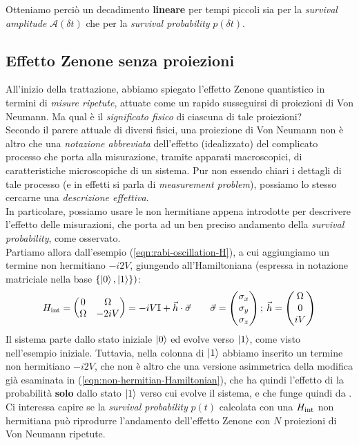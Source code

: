 \documentclass[../../InformazioneQuantistica.tex]{subfiles}
\begin{document}
Otteniamo perciò un decadimento \textbf{lineare} per tempi piccoli sia per la \textit{survival amplitude} $\mathcal{A}(\delta t)$ che per la \textit{survival probability} $p(\delta t)$.


\subsection{Effetto Zenone senza proiezioni}
All'inizio della trattazione, abbiamo spiegato l'effetto Zenone quantistico in termini di \textit{misure ripetute}, attuate come un rapido susseguirsi di proiezioni di Von Neumann. Ma qual è il \textit{significato fisico} di ciascuna di tale proiezioni?\\
Secondo il parere attuale di diversi fisici, una proiezione di Von Neumann non è altro che una \textit{notazione abbreviata} dell'effetto (idealizzato) del complicato processo che porta alla misurazione, tramite apparati macroscopici, di caratteristiche microscopiche di un sistema. Pur non essendo chiari i dettagli di tale processo (e in effetti si parla di \textit{measurement problem}), possiamo lo stesso cercarne una \textit{descrizione effettiva}.\\
In particolare, possiamo usare le  non hermitiane appena introdotte per descrivere l'effetto delle misurazioni, che porta ad un ben preciso andamento della \textit{survival probability}, come osservato.\\

Partiamo allora dall'esempio (\ref{eqn:rabi-oscillation-H}), a cui aggiungiamo un termine non hermitiano $-i2V$, giungendo all'Hamiltoniana (espressa in notazione matriciale nella base $\{\Ket{0}, \Ket{1}\})$:
\begin{align}
H_{\operatorname{int}} = \begin{pmatrix} 0 & \Omega \\ \Omega & - 2iV\end{pmatrix} = -iV \mathbb{I} + \vec{h}\cdot \vec{\sigma} \qquad \vec{\sigma} = \begin{pmatrix} \sigma_x\\\sigma_y \\ \sigma_z\end{pmatrix}; \> \vec{h} = \begin{pmatrix} \Omega \\ 0 \\ iV \end{pmatrix}
\label{eqn:H-non-hermitiana-esempio}
\end{align}
Il sistema parte dallo stato iniziale $\Ket{0}$ ed evolve verso $\Ket{1}$, come visto nell'esempio iniziale. Tuttavia, nella colonna di $\Ket{1}$ abbiamo inserito un termine non hermitiano $-i2V$, che non è altro che una versione asimmetrica della modifica già esaminata in (\ref{eqn:non-hermitian-Hamiltonian}), che ha quindi l'effetto di  la probabilità \textbf{solo} dallo stato $\Ket{1}$ verso cui evolve il sistema, e che funge quindi da . Ci interessa capire se la \textit{survival probability} $p(t)$ calcolata con una $H_{\operatorname{int}}$ non hermitiana può riprodurre l'andamento  dell'effetto Zenone con $N$ proiezioni di Von Neumann ripetute.\\
\end{document}
